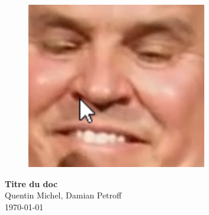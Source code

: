 \documentclass[a4paper,10pt,openany,oneside]{report}\usepackage[left=1cm,right=4cm,top=2cm,includefoot]{geometry}
\begin{document}
\begin{figure}
\centering
\vspace*{1cm}
\includegraphics[width=0.7\textwidth]{img/example.png}
\end{figure}
\vspace*{3cm}
\begin{center}
\textbf{\Huge{Titre du doc}} \\[1cm]
{\Large Quentin Michel, Damian Petroff} \\[5cm]
\today
\end{center}
\end{document}
